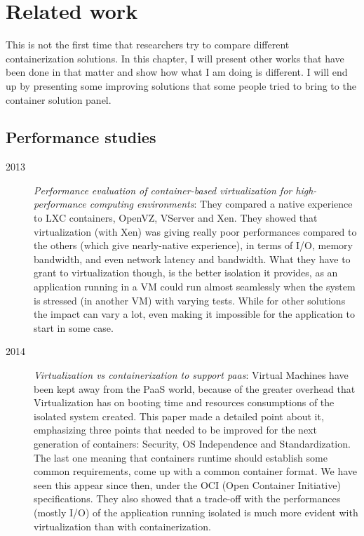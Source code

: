\chapter{Related work}

This is not the first time that researchers try to compare different containerization solutions.  In this chapter, I will present other works that have been done in that matter and show how what I am doing is different.  I will end up by presenting some improving solutions that some people tried to bring to the container solution panel.

\section{Performance studies}

\begin{description}
  \item[2013]\textit{Performance evaluation of container-based virtualization for high-performance computing environments}\cite{xavier2013performance}: They compared a native experience to LXC containers, OpenVZ, VServer and Xen.  They showed that virtualization (with Xen) was giving really poor performances compared to the others (which give nearly-native experience), in terms of I/O, memory bandwidth, and even network latency and bandwidth.  What they have to grant to virtualization though, is the better isolation it provides, as an application running in a VM could run almost seamlessly when the system is stressed (in another VM) with varying tests.  While for other solutions the impact can vary a lot, even making it impossible for the application to start in some case.
  
  \item[2014] \textit{Virtualization vs containerization to support paas}\cite{dua2014virtualization}: Virtual Machines have been kept away from the PaaS world, because of the greater overhead that Virtualization has on booting time and resources consumptions of the isolated system created.  This paper made a detailed point about it, emphasizing three points that needed to be improved for the next generation of containers: Security, OS Independence and Standardization.  The last one meaning that containers runtime should establish some common requirements, come up with a common container format.  We have seen this appear since then, under the OCI (Open Container Initiative) specifications.  They also showed that a trade-off with the performances (mostly I/O) of the application running isolated is much more evident with virtualization than with containerization.
  

\end{description}
